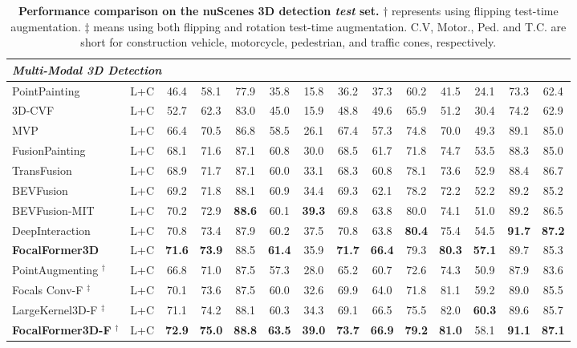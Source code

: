 \documentclass[10pt,twocolumn,letterpaper]{article}
\begin{document}
\begin{table*}[bpt]
\begin{center}
\begin{adjustbox}{width=1.\textwidth}
\begin{tabular}{lccccccccccccc}
			\midrule \midrule
                \multicolumn{5}{l}{\textit{Multi-Modal 3D Detection}} \\
                \midrule
			PointPainting \cite{pointpainting} & L+C & 46.4 & 58.1 & 77.9 & 35.8 & 15.8 & 36.2 & 37.3 & 60.2 & 41.5 & 24.1 & 73.3 & 62.4 \\
			3D-CVF \cite{3dcvf} & L+C & 52.7 & 62.3 & 83.0 & 45.0 & 15.9 & 48.8 & 49.6 & 65.9 & 51.2 & 30.4 & 74.2 & 62.9 \\
			MVP \cite{mvp} & L+C & 66.4 & 70.5 & 86.8 & 58.5 & 26.1 & 67.4 & 57.3 & 74.8 & 70.0 & 49.3 & 89.1 & 85.0 \\
			FusionPainting \cite{Fusionpainting} & L+C & 68.1 & 71.6 & 87.1 & 60.8 & 30.0 & 68.5 & 61.7 & 71.8 & 74.7 & 53.5 & 88.3 & 85.0 \\
			TransFusion \cite{transfusion} & L+C & 68.9 & 71.7 & 87.1 & 60.0 & 33.1 & 68.3 & 60.8 & 78.1 & 73.6 & 52.9 & 88.4 & 86.7 \\
			BEVFusion \cite{bevfusion} & L+C & 69.2 & 71.8 & 88.1 & 60.9 & 34.4 & 69.3 & 62.1 & 78.2 & 72.2 & 52.2 & 89.2 & 85.2 \\
			BEVFusion-MIT \cite{bevfusionmit} & L+C & 70.2 & 72.9 & \textbf{88.6} & 60.1 & \textbf{39.3} & 69.8 & 63.8 & 80.0 & 74.1 & 51.0 & 89.2 & 86.5 \\
			DeepInteraction \cite{deepinteraction} & L+C & 70.8 & 73.4 & 87.9 & 60.2 & 37.5 & 70.8 & 63.8 & \textbf{80.4} & 75.4 & 54.5 & \textbf{91.7} & \textbf{87.2} \\
			\textbf{FocalFormer3D} & L+C & \textbf{71.6} & \textbf{73.9} & 88.5 & \textbf{61.4} & 35.9 & \textbf{71.7} & \textbf{66.4} & 79.3 & \textbf{80.3} & \textbf{57.1} & 89.7 & 85.3 \\
			\midrule
			PointAugmenting \cite{pointaugmenting} $^\dag$ & L+C & 66.8 & 71.0 & 87.5 & 57.3 & 28.0 & 65.2 & 60.7 & 72.6 & 74.3 & 50.9 & 87.9 & 83.6 \\
			Focals Conv-F \cite{focalsconv} $^\ddag$ & L+C & 70.1 & 73.6 & 87.5 & 60.0 & 32.6 & 69.9 & 64.0 & 71.8 & 81.1 & 59.2 & 89.0 & 85.5 \\
			LargeKernel3D-F \cite{largekernel3d} $^\ddag$ & L+C & 71.1 & 74.2 & 88.1 & 60.3 & 34.3 & 69.1 & 66.5 & 75.5 & 82.0 & \textbf{60.3} & 89.6 & 85.7 \\
\textbf{FocalFormer3D-F} $^\dag$  & L+C & \textbf{72.9} & \textbf{75.0} & \textbf{88.8} & \textbf{63.5} & \textbf{39.0} & \textbf{73.7} & \textbf{66.9} & \textbf{79.2} & \textbf{81.0} & 58.1 & \textbf{91.1} & \textbf{87.1} \\
			\bottomrule
		\end{tabular}
		\end{adjustbox}
	\end{center}
	\caption{\textbf{Performance comparison on the nuScenes 3D detection \textit{test} set.} $\dag$ represents using flipping test-time augmentation. $\ddag$ means using both flipping and rotation test-time augmentation. C.V, Motor., Ped. and T.C. are short for construction vehicle, motorcycle, pedestrian, and traffic cones, respectively.
}
	\label{tab: nuScenes test results}
\end{table*}
\end{document}
